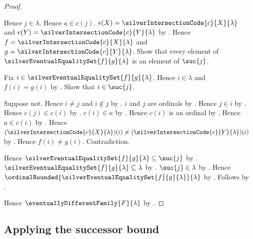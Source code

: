 \begin{proof}
\begin{subproof}
        Hence $j\in\lambda$.
        Hence $a\in c(j)$.
        $e(X)=\silverIntersectionCode{c}{X}{\lambda}$ and
            $e(Y)=\silverIntersectionCode{c}{Y}{\lambda}$
            by .
        Hence $f=\silverIntersectionCode{c}{X}{\lambda}$ and
            $g=\silverIntersectionCode{c}{Y}{\lambda}$.
        Show that every element of
            $\silverEventualEqualitySet{f}{g}{\lambda}$
            is an element of $\suc{j}$.
        \begin{subproof}
            Fix $i\in\silverEventualEqualitySet{f}{g}{\lambda}$.
            Hence $i\in\lambda$ and $f(i)=g(i)$
                by .
            Show that $i\in\suc{j}$.
            \begin{subproof}
                Suppose not.
                Hence $i\neq j$ and $i\notin j$ by .
                $i$ and $j$ are ordinals
                    by .
                Hence $j\in i$ by .
                Hence $c(j)\in c(i)$
                    by .
                $c(i)\in\kappa$ by .
                Hence $c(i)$ is an ordinal
                    by .
                Hence $a\in c(i)$ by .
                Hence $(\silverIntersectionCode{c}{X}{\lambda})(i)
                    \neq(\silverIntersectionCode{c}{Y}{\lambda})(i)$
                    by .
                Hence $f(i)\neq g(i)$.
                Contradiction.
            \end{subproof}
        \end{subproof}
        Hence $\silverEventualEqualitySet{f}{g}{\lambda}
            \subseteq\suc{j}$ by .
        $\silverEventualEqualitySet{f}{g}{\lambda}\subseteq\lambda$
            by .
        $\suc{j}\in\lambda$ by .
        Hence $\ordinalBounded{
            \silverEventualEqualitySet{f}{g}{\lambda}}{\lambda}$
            by .
        Follows by .
    \end{subproof}
    Hence $\eventuallyDifferentFamily{F}{\lambda}$
        by .
\end{proof}

\subsection{Applying the successor bound}


